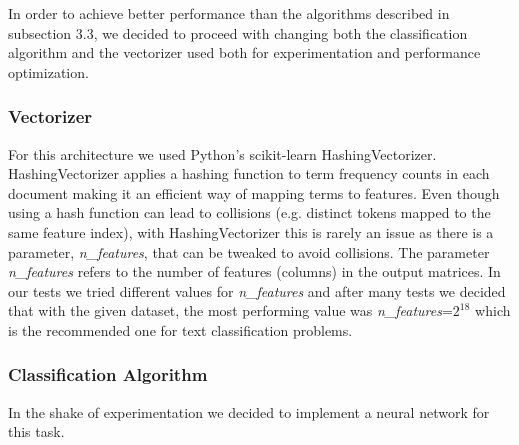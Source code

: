 In order to achieve better performance than the algorithms described in subsection 3.3, we decided to proceed with changing both the classification algorithm and the vectorizer used both for experimentation and performance optimization.

\subsubsection{Vectorizer}
For this architecture we used Python's scikit-learn HashingVectorizer. HashingVectorizer applies a hashing function to term frequency counts in each document making it an efficient way of mapping terms to features. Even though using a hash function can lead to collisions (e.g. distinct tokens mapped to the same feature index), with HashingVectorizer this is rarely an issue as there is a parameter, \textit{n\_features}, that can be tweaked to avoid collisions. The parameter \textit{n\_features} refers to the number of features (columns) in the output matrices. In our tests we tried different values for \textit{n\_features} and after many tests we decided that with the given dataset, the most performing value was \textit{n\_features}=$2^{18}$ which is the recommended one for text classification problems.

\subsubsection{Classification Algorithm}
In the shake of experimentation we decided to implement a neural network for this task.